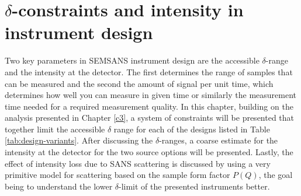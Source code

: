 \documentclass{article}
\begin{document}





\newpage
\section{$\delta$-constraints and intensity in instrument design}
\label{c4:constraints}
Two key parameters in SEMSANS instrument design are the accessible $\delta$-range and the intensity at the detector. The first determines the range of samples that can be measured and the second the amount of signal per unit time, which determines how well you can measure in given time or similarly the measurement time needed for a required measurement quality. In this chapter, building on the analysis presented in Chapter \ref{c3}, a system of constraints will be presented that together limit the accessible $\delta$ range for each of the designs listed in Table \ref{tab:design-variants}. After discussing the $\delta$-ranges, a coarse estimate for the intensity at the detector for the two source options will be presented. Lastly, the effect of intensity loss due to SANS scattering is discussed by using a very primitive model for scattering based on the sample form factor $P(Q)$, the goal being to understand the lower $\delta$-limit of the presented instruments better.
\end{document}
